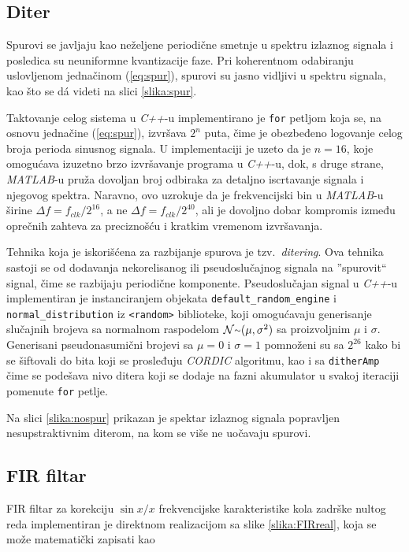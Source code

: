 \documentclass[conference]{IEEEtran}
\begin{document}
\subsection{Diter}
Spurovi se javljaju kao neželjene periodične smetnje u spektru izlaznog signala i posledica su neuniformne kvantizacije faze. Pri koherentnom odabiranju uslovljenom jednačinom (\ref{eq:spur}), spurovi su jasno vidljivi u spektru signala, kao što se d\'a videti na slici \ref{slika:spur}.

Taktovanje celog sistema u \textit{C++}-u implementirano je \texttt{for} petljom koja se, na osnovu jednačine (\ref{eq:spur}), izvršava $2^n$ puta, čime je obezbeđeno logovanje celog broja perioda sinusnog signala. U implementaciji je uzeto da je $n=16$, koje omogućava izuzetno brzo izvršavanje programa u \textit{C++}-u, dok, s druge strane, \textit{MATLAB}-u pruža dovoljan broj odbiraka za detaljno iscrtavanje signala i njegovog spektra. Naravno, ovo uzrokuje da je frekvencijski bin u \textit{MATLAB}-u širine $\Delta f=f_{clk}/2^{16}$, a ne $\Delta f=f_{clk}/2^{40}$, ali je dovoljno dobar kompromis između oprečnih zahteva za preciznošću i kratkim vremenom izvršavanja.

Tehnika koja je iskorišćena za razbijanje spurova je tzv.~\textit{ditering}. Ova tehnika sastoji se od dodavanja nekorelisanog ili pseudoslučajnog signala na ''spurovit`` signal, čime se razbijaju periodične komponente. Pseudoslučajan signal u \textit{C++}-u implementiran je instanciranjem objekata \texttt{default\_random\_engine} i \texttt{normal\_distribution} iz \texttt{<random>} biblioteke, koji omogućavaju generisanje slučajnih brojeva sa normalnom raspodelom $\mathcal{N} {\raise.17ex\hbox{$\scriptstyle\mathtt{\sim}$}} (\mu, \sigma^2)$ sa proizvoljnim $\mu$ i $\sigma$. Generisani pseudonasumični brojevi sa $\mu=0$ i $\sigma=1$ pomnoženi su sa $2^{26}$ kako bi se šiftovali do bita koji se prosleđuju \textit{CORDIC} algoritmu, kao i sa \texttt{ditherAmp} čime se podešava nivo ditera koji se dodaje na fazni akumulator u svakoj iteraciji pomenute \texttt{for} petlje.

Na slici \ref{slika:nospur} prikazan je spektar izlaznog signala popravljen nesupstraktivnim diterom, na kom se više ne uočavaju spurovi.

\subsection{FIR filtar}
FIR filtar za korekciju $\sin x/x$ frekvencijske karakteristike kola zadrške nultog reda implementiran je direktnom realizacijom sa slike \ref{slika:FIRreal}, koja se može matematički zapisati kao
\end{document}
